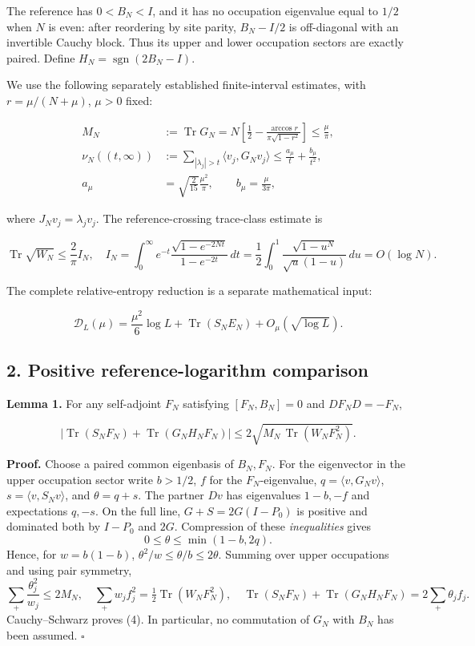 \documentclass[
  10pt,
  a4paper,
]{article}
\begin{document}
The reference has \(0<B_N<I\), and it has no occupation eigenvalue equal to \(1/2\) when \(N\) is even: after reordering by site parity, \(B_N-I/2\) is off-diagonal with an invertible Cauchy block. Thus its upper and lower occupation sectors are exactly paired. Define \(H_N=\operatorname{sgn}(2B_N-I)\).

We use the following separately established finite-interval estimates, with \(r=\mu/(N+\mu)\), \(\mu>0\) fixed:

\[
\begin{aligned}
M_N&:=\operatorname{Tr}G_N
=N\left[\frac12-\frac{\arccos r}{\pi\sqrt{1-r^2}}\right]\le\frac{\mu}{\pi},\\
\nu_N((t,\infty))&:=\sum_{|\lambda_j|>t}\langle v_j,G_Nv_j\rangle
\le\frac{a_\mu}{t}+\frac{b_\mu}{t^2},\\
a_\mu&=\sqrt{\frac2{15}}\frac{\mu^2}{\pi},\qquad b_\mu=\frac{\mu}{3\pi},
\end{aligned}
\tag{1}
\]

where \(J_Nv_j=\lambda_jv_j\). The reference-crossing trace-class estimate is

\[
\operatorname{Tr}\sqrt{W_N}\le\frac2\pi I_N,\quad
I_N=\int_0^\infty e^{-t}\frac{\sqrt{1-e^{-2Nt}}}{1-e^{-2t}}\,dt
=\frac12\int_0^1\frac{\sqrt{1-u^N}}{\sqrt u(1-u)}\,du
=O(\log N).
\tag{2}
\]

The complete relative-entropy reduction is a separate mathematical input:

\[
\mathcal D_L(\mu)=\frac{\mu^2}{6}\log L+\operatorname{Tr}(S_NE_N)+O_\mu(\sqrt{\log L}).
\tag{3}
\]

\subsection{2. Positive reference-logarithm comparison}\label{positive-reference-logarithm-comparison}

\textbf{Lemma 1.} For any self-adjoint \(F_N\) satisfying \([F_N,B_N]=0\) and \(DF_ND=-F_N\),

\[
\left|\operatorname{Tr}(S_NF_N)+\operatorname{Tr}(G_NH_NF_N)\right|
\le2\sqrt{M_N\,\operatorname{Tr}(W_NF_N^2)}.
\tag{4}
\]

\textbf{Proof.} Choose a paired common eigenbasis of \(B_N,F_N\). For the eigenvector in the upper occupation sector write \(b>1/2\), \(f\) for the \(F_N\)-eigenvalue, \(q=\langle v,G_Nv\rangle\), \(s=\langle v,S_Nv\rangle\), and \(\theta=q+s\). The partner \(Dv\) has eigenvalues \(1-b,-f\) and expectations \(q,-s\). On the full line, \(G+S=2G(I-P_0)\) is positive and dominated both by \(I-P_0\) and \(2G\). Compression of these \emph{inequalities} gives \[
0\le\theta\le\min(1-b,2q).
\] Hence, for \(w=b(1-b)\), \(\theta^2/w\le\theta/b\le2\theta\). Summing over upper occupations and using pair symmetry, \[
\sum_+\frac{\theta_j^2}{w_j}\le2M_N,\quad
\sum_+w_jf_j^2=\tfrac12\operatorname{Tr}(W_NF_N^2),
\quad\operatorname{Tr}(S_NF_N)+\operatorname{Tr}(G_NH_NF_N)=2\sum_+\theta_j f_j.
\] Cauchy--Schwarz proves (4). In particular, no commutation of \(G_N\) with \(B_N\) has been assumed. \(\square\)
\end{document}
